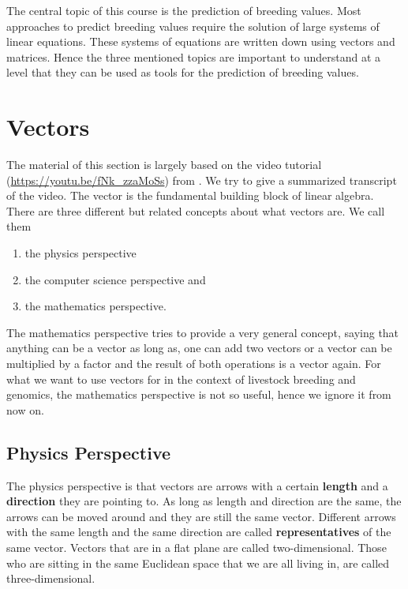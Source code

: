 \documentclass[]{book}
\providecommand{\tightlist}{%
  \setlength{\itemsep}{0pt}\setlength{\parskip}{0pt}}
\theoremstyle{definition}
\theoremstyle{definition}
\theoremstyle{definition}
\theoremstyle{remark}
\begin{document}
The central topic of this course is the prediction of breeding values. Most approaches to predict breeding values require the solution of large systems of linear equations. These systems of equations are written down using vectors and matrices. Hence the three mentioned topics are important to understand at a level that they can be used as tools for the prediction of breeding values.

\hypertarget{intro-linalg-vectors}{%
\section{Vectors}\label{intro-linalg-vectors}}

The material of this section is largely based on the video tutorial (\url{https://youtu.be/fNk_zzaMoSs}) from \citep{3blue1brown2016}. We try to give a summarized transcript of the video. The vector is the fundamental building block of linear algebra. There are three different but related concepts about what vectors are. We call them

\begin{enumerate}
\def\labelenumi{\arabic{enumi}.}
\tightlist
\item
  the physics perspective
\item
  the computer science perspective and
\item
  the mathematics perspective.
\end{enumerate}

The mathematics perspective tries to provide a very general concept, saying that anything can be a vector as long as, one can add two vectors or a vector can be multiplied by a factor and the result of both operations is a vector again. For what we want to use vectors for in the context of livestock breeding and genomics, the mathematics perspective is not so useful, hence we ignore it from now on.

\hypertarget{intro-linalg-physics-perspective}{%
\subsection{Physics Perspective}\label{intro-linalg-physics-perspective}}

The physics perspective is that vectors are arrows with a certain \textbf{length} and a \textbf{direction} they are pointing to. As long as length and direction are the same, the arrows can be moved around and they are still the same vector. Different arrows with the same length and the same direction are called \textbf{representatives} of the same vector. Vectors that are in a flat plane are called two-dimensional. Those who are sitting in the same Euclidean space that we are all living in, are called three-dimensional.
\end{document}
